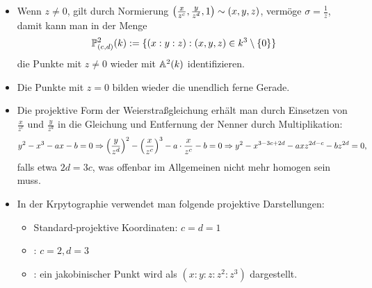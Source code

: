 \begin{bem}
	\begin{itemize}
		\item Wenn $z \neq 0$, gilt durch Normierung $\enbrace*{\frac{x}{z^c}, \frac{y}{z^d},1} \sim (x,y,z)$, vermöge $\sigma = \frac{1}{z}$, damit kann man in der Menge
		\[
			\PP_{(c,d)}^2(k) := \{ (x:y:z) : (x,y,z) \in k^3 \setminus \setnull \}
		\]
		die Punkte mit $z \neq 0$ wieder mit $\aff^2(k)$ identifizieren.
		\item Die Punkte mit $z = 0$ bilden wieder die unendlich ferne Gerade.
		\item Die projektive Form der Weierstraßgleichung erhält man durch Einsetzen von $\frac{x}{z^c}$ und $\frac{y}{z^d}$ in die Gleichung und Entfernung der Nenner durch Multiplikation:
		\[
			y^2 - x^3 - ax - b = 0 \Rightarrow \enbrace*{\frac{y}{z^d}}^2 - \enbrace*{\frac{x}{z^c}}^3 - a \cdot \frac{x}{z^c} - b = 0 \Rightarrow y^2 - x^{3-3c+2d} - axz^{2d-c} - bz^{2d} = 0,
		\]
		falls etwa $2d = 3c$, was offenbar im Allgemeinen nicht mehr homogen sein muss.
		\item In der Krpytographie verwendet man folgende projektive Darstellungen:
			\begin{itemize}
				\item Standard-projektive Koordinaten: $c=d=1$
				\item {}: $c=2, d=3$
				\item {}: ein jakobinischer Punkt wird als $(x:y:z:z^2:z^3)$ dargestellt.
			\end{itemize}
	\end{itemize}
\end{bem}

